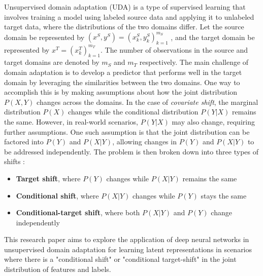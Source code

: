 Unsupervised domain adaptation (UDA) is a type of supervised learning that involves training a model using labeled source data and applying it to unlabeled target data, where the distributions of the two domains differ. Let the source domain be represented by $(x^S , y^S ) = (x^S_k , y^S_k)_{k=1}^{m_S}$ , and the target domain be represented by $x^T = (x_k^T)_{k=1}^{m_T}$. The number of observations in the source and target domains are denoted by $m_S$ and $m_T$ respectively. The main challenge of domain adaptation is to develop a predictor that performs well in the target domain by leveraging the similarities between the two domains. One way to accomplish this is by making assumptions about how the joint distribution $P(X, Y)$ changes across the domains. In the case of \textit{covariate shift}, the marginal distribution $P(X)$ changes while the conditional distribution $P(Y|X)$ remains the same. However, in real-world scenarios, $P(Y|X)$ may also change, requiring further assumptions. One such assumption is that the joint distribution can be factored into $P(Y)$ and $P(X|Y)$, allowing changes in $P(Y)$ and $P(X|Y)$ to be addressed independently. The problem is then broken down into three types of shifts \cite{stojanov2021domain}: 

\begin{itemize}
    \item \textbf{Target shift}, where $P(Y)$ changes while $P(X|Y)$ remains the same
    \item \textbf{Conditional shift}, where $P(X|Y)$ changes while $P(Y)$ stays the same
    \item \textbf{Conditional-target shift}, where both $P(X|Y)$ and $P(Y)$ change independently
\end{itemize}

This research paper aims to explore the application of deep neural networks in unsupervised domain adaptation for learning latent representations in scenarios where there is a "conditional shift" or "conditional target-shift" in the joint distribution of features and labels.